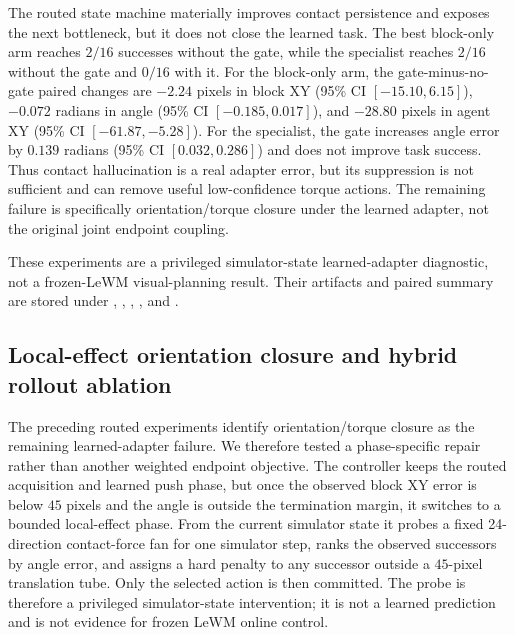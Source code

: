 \documentclass{article}
\begin{document}
The routed state machine materially improves contact persistence and exposes
the next bottleneck, but it does not close the learned task. The best
block-only arm reaches $2/16$ successes without the gate, while the
specialist reaches $2/16$ without the gate and $0/16$ with it. For the
block-only arm, the gate-minus-no-gate paired changes are $-2.24$ pixels in
block XY (95\% CI $[-15.10,6.15]$), $-0.072$ radians in angle
(95\% CI $[-0.185,0.017]$), and $-28.80$ pixels in agent XY
(95\% CI $[-61.87,-5.28]$). For the specialist, the gate increases angle
error by $0.139$ radians (95\% CI $[0.032,0.286]$) and does not improve task
success. Thus contact hallucination is a real adapter error, but its
suppression is not sufficient and can remove useful low-confidence torque
actions. The remaining failure is specifically orientation/torque closure
under the learned adapter, not the original joint endpoint coupling.

These experiments are a privileged simulator-state learned-adapter
diagnostic, not a frozen-LeWM visual-planning result. Their artifacts and
paired summary are stored under
,
,
,
,
and
.

\subsection{Local-effect orientation closure and hybrid rollout ablation}
\label{sec:supp-learned-local-effect}

The preceding routed experiments identify orientation/torque closure as the
remaining learned-adapter failure.  We therefore tested a phase-specific
repair rather than another weighted endpoint objective.  The controller keeps
the routed acquisition and learned push phase, but once the observed block XY
error is below $45$ pixels and the angle is outside the termination margin, it
switches to a bounded local-effect phase.  From the current simulator state it
probes a fixed 24-direction contact-force fan for one simulator step, ranks
the observed successors by angle error, and assigns a hard penalty to any
successor outside a $45$-pixel translation tube.  Only the selected action is
then committed.  The probe is therefore a privileged simulator-state
intervention; it is not a learned prediction and is not evidence for frozen
LeWM online control.
\end{document}
